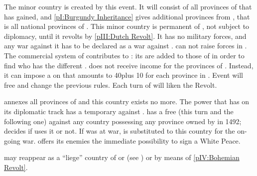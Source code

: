 \effetlong
{}
\bparag The minor country \paysHollande is created by this event.  It will
consist of all provinces of \paysprovincesne that \SPA has gained, and
\ref{pI:Burgundy Inheritance} gives additional provinces from \paysBourgogne,
that is all national provinces of \paysHollande. This minor country is
permanent \VASSAL of \SPA, not subject to diplomacy, until it revolts by
\ref{pIII:Dutch Revolt}. It has no military forces, and any war against it has
to be declared as a war against \SPA. \SPA can not raise forces in
\paysHollande.
\bparag The commercial system of \paysHollande contributes to \SPA: its
\TradeFLEET are added to those of \SPA in order to find who has the different
\CC.
\bparag \SPA does not receive income for the provinces of \paysHollande.
Instead, it can impose a  on \paysHollande that amounts to
40\ducats plus 10 \ducats for each province in \paysHollande.
\bparag Event  will free \paysHollande and change the
previous rules. Each turn of  will liken the Revolt.






\phevnt
\aparag \HAB annexes all provinces of \paysBoheme and this country exists no
more.  The power that has \paysBoheme on its diplomatic track has a temporary
\CB against \HAB.
\aparag \HAB has a free \CB (this turn and the following one) against any
country possessing any province owned by \paysBoheme in 1492; \SPA decides if
\HAB uses it or not.
\aparag If \paysBoheme was at war, \HAB is substituted to this country for the
on-going war. \HAB offers its enemies the immediate possibility to sign a
White Peace.

\effetlong
\aparag \paysBoheme may reappear as a ``liege'' country of \HAB or \SPA (see
) or by means of \ref{pIV:Bohemian
  Revolt}.






